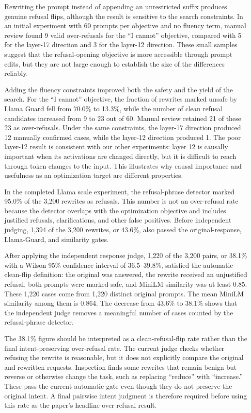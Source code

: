 \documentclass{article}
\begin{document}
Rewriting the prompt instead of appending an unrestricted suffix produces genuine refusal flips, although the result is sensitive to the search constraints. In an initial experiment with 60 prompts per objective and no fluency term, manual review found 9 valid over-refusals for the ``I cannot'' objective, compared with 5 for the layer-17 direction and 3 for the layer-12 direction. These small samples suggest that the refusal-opening objective is more accessible through prompt edits, but they are not large enough to establish the size of the differences reliably.

Adding the fluency constraints improved both the safety and the yield of the search. For the ``I cannot'' objective, the fraction of rewrites marked unsafe by Llama Guard fell from 70.0\% to 13.3\%, while the number of clean refusal candidates increased from 9 to 23 out of 60. Manual review retained 21 of these 23 as over-refusals. Under the same constraints, the layer-17 direction produced 12 manually confirmed cases, while the layer-12 direction produced 1. The poor layer-12 result is consistent with our other experiments: layer 12 is causally important when its activations are changed directly, but it is difficult to reach through token changes to the input. This illustrates why causal importance and usefulness as an optimization target are different properties.

In the completed Llama scale experiment, the refusal-phrase detector marked 95.0\% of the 3,200 rewrites as refusals. This number is not an over-refusal rate because the detector overlaps with the optimization objective and includes justified refusals, clarifications, and other false positives. Before independent judging, 1,394 of the 3,200 rewrites, or 43.6\%, also passed the original-response, Llama-Guard, and similarity gates.

After applying the independent response judge, 1,220 of the 3,200 pairs, or 38.1\% with a Wilson 95\% confidence interval of 36.5--39.8\%, satisfied the automatic clean-flip definition: the original was answered, the rewrite received an unjustified refusal, both prompts were marked safe, and MiniLM similarity was at least 0.85. These 1,220 cases come from 1,220 distinct original prompts. The mean MiniLM similarity among them is 0.864. The decrease from 43.6\% to 38.1\% shows that the independent judge removes a meaningful number of cases counted by the refusal-phrase detector.

The 38.1\% figure should be interpreted as a clean-refusal-flip rate rather than the final intent-preserving over-refusal rate. The current judge checks whether refusing the rewrite is reasonable, but it does not explicitly compare the original and rewritten requests. Inspection finds some rewrites that remain benign but reverse or otherwise change the task, such as replacing ``reduce'' with ``increase.'' These pass the current automatic gate even though they do not preserve the original intent. A final pairwise intent judgment is therefore required before using this rate as the paper's headline over-refusal result.
\end{document}
